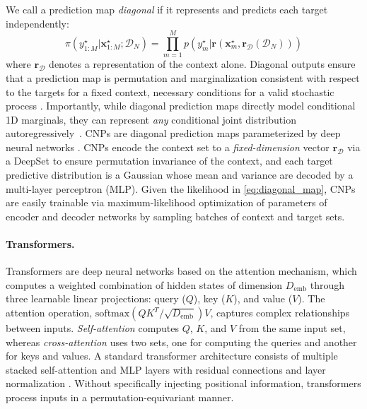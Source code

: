 \documentclass[twoside]{article}
\renewcommand{\r}{\mathbf{r}}
\newcommand{\data}{\mathcal{D}}
\newcommand{\xt}{\mathbf{x}^\star}
\newcommand{\yt}{{y}^\star}
\begin{document}
We call a prediction map \emph{diagonal} if it represents and predicts each target independently:
\begin{equation}
\label{eq:diagonal_map}
 \pi(\yt_{1:M} \vert \xt_{1:M}; \data_N ) =
 \prod_{m=1}^M p\left(\yt_m| \r(\xt_m, \r_{\data}(\data_N))\right)
\end{equation}
%
where $\r_{\data}$ denotes a representation of the context alone. Diagonal outputs ensure that a prediction map is permutation and marginalization consistent with respect to the targets for a fixed context, necessary conditions for a valid stochastic process \citep{markou2022practical}.
Importantly, while diagonal prediction maps directly model conditional 1D marginals, they can represent \emph{any} conditional joint distribution autoregressively~\citep{bruinsma2023autoregressive}.
%
CNPs are diagonal prediction maps parameterized by deep neural networks \citep{garnelo2018conditional}. CNPs encode the context set to a \emph{fixed-dimension} vector $\r_{\data}$ via a DeepSet  \citep{zaheer2017deep} to ensure permutation invariance of the context, and each target predictive distribution is a Gaussian whose mean and variance are decoded by a multi-layer perceptron (MLP).
Given the likelihood in \cref{eq:diagonal_map}, CNPs are easily trainable via maximum-likelihood optimization of parameters of encoder and decoder networks by sampling batches of context and target sets.

\vspace{-0.25em}
\paragraph{Transformers.}
Transformers \citep{vaswani2017attention} are deep neural networks based on the attention mechanism, which computes a weighted combination of hidden states of dimension $D_\text{emb}$ through three learnable linear projections: query ($Q$), key ($K$), and value ($V$). The attention operation, $\text{softmax}(QK^T / \sqrt{D_\text{emb}})V$, captures complex relationships between inputs. \emph{Self-attention} computes $Q$, $K$, and $V$ from the same input set, whereas \emph{cross-attention} uses two sets, one for computing the queries and another for keys and values.
A standard transformer architecture consists of multiple stacked self-attention and MLP layers with residual connections and layer normalization \citep{vaswani2017attention}. Without specifically injecting positional information, transformers process inputs in a permutation-equivariant manner. 
\end{document}
